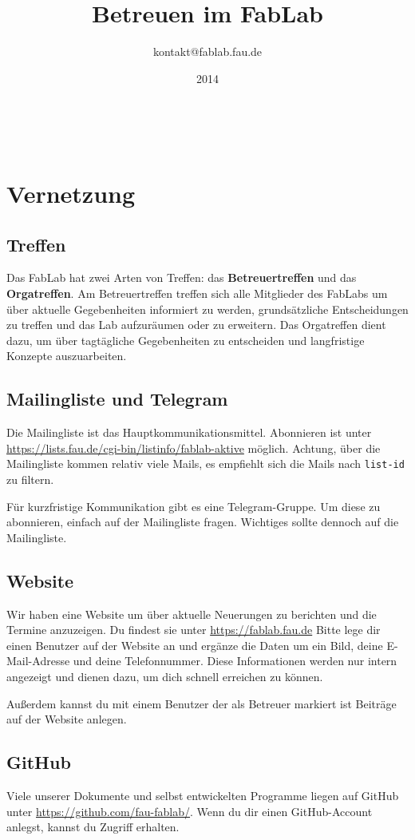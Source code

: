 \documentclass{\basedir/fablab-document}
\date{2014}
\author{kontakt@fablab.fau.de}
\title{Betreuen im FabLab}
\begin{document}
~
\section{Vernetzung}
\subsection{Treffen}
Das FabLab hat zwei Arten von Treffen: das \textbf{Betreuertreffen} und das \textbf{Orgatreffen}.
Am Betreuertreffen treffen sich alle Mitglieder des FabLabs um über aktuelle Gegebenheiten informiert zu werden,
grundsätzliche Entscheidungen zu treffen und das Lab aufzuräumen oder zu erweitern.
Das Orgatreffen dient dazu, um über tagtägliche Gegebenheiten zu entscheiden und langfristige Konzepte auszuarbeiten.

\subsection{Mailingliste und Telegram}
Die Mailingliste ist das Hauptkommunikationsmittel.
Abonnieren ist unter \url{https://lists.fau.de/cgi-bin/listinfo/fablab-aktive} möglich.
Achtung, über die Mailingliste kommen relativ viele Mails, es empfiehlt sich die Mails nach \texttt{list-id} zu filtern.

Für kurzfristige Kommunikation gibt es eine Telegram-Gruppe.
Um diese zu abonnieren, einfach auf der Mailingliste fragen.
Wichtiges sollte dennoch auf die Mailingliste.
\subsection{Website}
Wir haben eine Website um über aktuelle Neuerungen zu berichten und die Termine anzuzeigen.
Du findest sie unter \url{https://fablab.fau.de}
Bitte lege dir einen Benutzer auf der Website an und ergänze die Daten um ein Bild, deine E-Mail-Adresse und deine Telefonnummer.
Diese Informationen werden nur intern angezeigt und dienen dazu, um dich schnell erreichen zu können.

Außerdem kannst du mit einem Benutzer der als Betreuer markiert ist Beiträge auf der Website anlegen.

\subsection{GitHub}
Viele unserer Dokumente und selbst entwickelten Programme liegen auf GitHub unter \url{https://github.com/fau-fablab/}.
Wenn du dir einen GitHub-Account anlegst, kannst du Zugriff erhalten.
\end{document}
